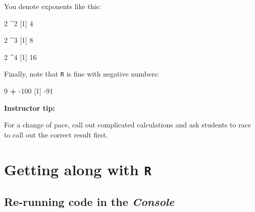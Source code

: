 \documentclass[
]{book}
\newenvironment{Shaded}{\begin{snugshade}}{\end{snugshade}}
\newcommand{\DecValTok}[1]{\textcolor[rgb]{0.00,0.00,0.81}{#1}}
\newcommand{\NormalTok}[1]{#1}
\newcommand{\OperatorTok}[1]{\textcolor[rgb]{0.81,0.36,0.00}{\textbf{#1}}}
\newcommand{\StringTok}[1]{\textcolor[rgb]{0.31,0.60,0.02}{#1}}
\begin{document}
You denote exponents like this:

\begin{Shaded}
\begin{Highlighting}[]
\DecValTok{2} \OperatorTok{^}\DecValTok{2}
\NormalTok{[}\DecValTok{1}\NormalTok{] }\DecValTok{4}
\end{Highlighting}
\end{Shaded}

\begin{Shaded}
\begin{Highlighting}[]
\DecValTok{2} \OperatorTok{^}\DecValTok{3}
\NormalTok{[}\DecValTok{1}\NormalTok{] }\DecValTok{8}
\end{Highlighting}
\end{Shaded}

\begin{Shaded}
\begin{Highlighting}[]
\DecValTok{2} \OperatorTok{^}\DecValTok{4}
\NormalTok{[}\DecValTok{1}\NormalTok{] }\DecValTok{16}
\end{Highlighting}
\end{Shaded}

Finally, note that \texttt{R} is fine with negative numbers:

\begin{Shaded}
\begin{Highlighting}[]
\DecValTok{9} \OperatorTok{+}\StringTok{ }\DecValTok{-100}
\NormalTok{[}\DecValTok{1}\NormalTok{] }\DecValTok{-91}
\end{Highlighting}
\end{Shaded}

\leavevmode\hypertarget{tip-text}{}%
\textbf{Instructor tip:}

For a change of pace, call out complicated calculations and ask students to race to call out the correct result first.

\hypertarget{getting-along-with-r}{%
\section*{\texorpdfstring{Getting along with \texttt{R}}{Getting along with R}}\label{getting-along-with-r}}

\hypertarget{re-running-code-in-the-console}{%
\subsection*{\texorpdfstring{Re-running code in the \emph{Console}}{Re-running code in the Console}}\label{re-running-code-in-the-console}}
\end{document}
